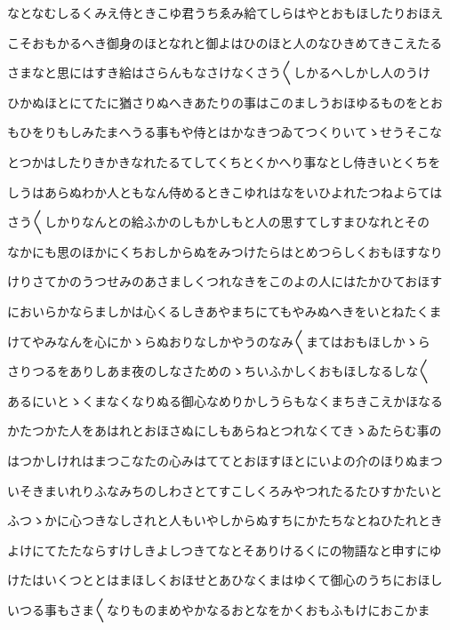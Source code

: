 \documentclass[a4paper,11pt,landscape]{ltjtarticle}
\begin{document}
\par\medskip
なとなむしるくみえ侍ときこゆ君うちゑみ給てしらはやとおもほしたりおほえ
\par\medskip
こそおもかるへき御身のほとなれと御よはひのほと人のなひきめてきこえたる
\par\medskip
さまなと思にはすき給はさらんもなさけなくさう〱しかるへしかし人のうけ
\par\medskip
ひかぬほとにてたに猶さりぬへきあたりの事はこのましうおほゆるものをとお
\par\medskip
もひをりもしみたまへうる事もや侍とはかなきつゐてつくりいてゝせうそこな
\par\medskip
とつかはしたりきかきなれたるてしてくちとくかへり事なとし侍きいとくちを
\par\medskip
しうはあらぬわか人ともなん侍めるときこゆれはなをいひよれたつねよらては
\par\medskip
さう〱しかりなんとの給ふかのしもかしもと人の思すてしすまひなれとその
\par\medskip
なかにも思のほかにくちおしからぬをみつけたらはとめつらしくおもほすなり
\par\medskip
けりさてかのうつせみのあさましくつれなきをこのよの人にはたかひておほす
\par\medskip
においらかならましかは心くるしきあやまちにてもやみぬへきをいとねたくま
\par\medskip
けてやみなんを心にかゝらぬおりなしかやうのなみ〱まてはおもほしかゝら
\par\medskip
さりつるをありしあま夜のしなさためのゝちいふかしくおもほしなるしな〱
\par\medskip
あるにいとゝくまなくなりぬる御心なめりかしうらもなくまちきこえかほなる
\par\medskip
かたつかた人をあはれとおほさぬにしもあらねとつれなくてきゝゐたらむ事の
\par\medskip
はつかしけれはまつこなたの心みはててとおほすほとにいよの介のほりぬまつ
\par\medskip
いそきまいれりふなみちのしわさとてすこしくろみやつれたるたひすかたいと
\par\medskip
ふつゝかに心つきなしされと人もいやしからぬすちにかたちなとねひたれとき
\par\medskip
よけにてたたならすけしきよしつきてなとそありけるくにの物語なと申すにゆ
\par\medskip
けたはいくつととはまほしくおほせとあひなくまはゆくて御心のうちにおほし
\par\medskip
いつる事もさま〱なりものまめやかなるおとなをかくおもふもけにおこかま
\par\medskip
\end{document}
